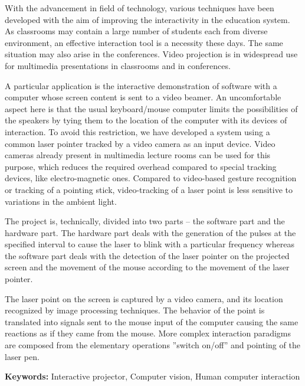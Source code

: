 \thispagestyle{plain}
\begin{center}
	\large
	\vspace{0.5cm}	
\end{center}

        With the advancement in field of technology, various techniques have been developed with the aim of improving the interactivity in the education system. As classrooms may contain a large number of students each from diverse environment, an effective interaction tool is a necessity these days. The same situation may also arise in the conferences. Video projection is in widespread use for multimedia presentations in classrooms and in conferences. 

A particular application is the interactive demonstration of software with a computer whose screen content is sent to a video beamer. An uncomfortable aspect here is that the usual keyboard/mouse computer limits the possibilities of the speakers by tying them to the location of the computer with its devices of interaction. To avoid this restriction, we have developed a system using a common laser pointer tracked by a video camera as an input device. Video cameras already present in multimedia lecture rooms can be used for this purpose, which reduces the required overhead compared to special tracking devices, like electro-magnetic ones. Compared to video-based gesture recognition or tracking of a pointing stick, video-tracking of a laser point is less sensitive to variations in the ambient
light.

The project is, technically, divided into two parts – the software part and the hardware part. The hardware part deals with the generation of the pulses at the specified interval to cause the laser to blink with a particular frequency whereas the software part deals with the detection of the laser pointer on the projected screen and the movement of the mouse according to the movement of the laser pointer.

The laser point on the screen is captured by a video camera, and its location recognized by image processing techniques. The behavior of the point is translated into signals sent to the mouse input of the computer causing the same reactions as if they came from the mouse. More complex interaction paradigms are composed from the elementary operations ”switch on/off” and pointing of the laser pen.

\textbf{Keywords:} Interactive projector, Computer vision, Human computer interaction